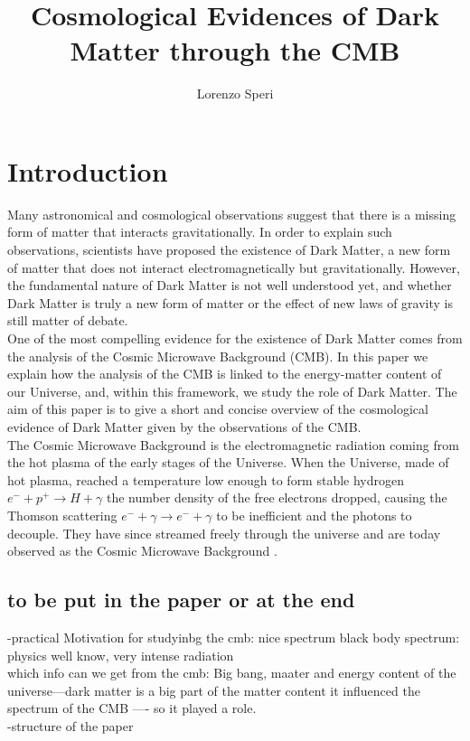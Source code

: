 \documentclass{article}
\title{Cosmological Evidences of Dark Matter through the CMB}
\author{Lorenzo Speri}
\date{}
\begin{document}
\maketitle


\section{Introduction}
Many astronomical and cosmological observations suggest that there is a missing form of matter that interacts gravitationally. 
In order to explain such observations, scientists have proposed the existence of Dark Matter, a new form of matter that does not interact electromagnetically but gravitationally.
However, the fundamental nature of Dark Matter is not well understood yet, and whether Dark Matter is truly a new form of matter or the effect of new laws of gravity is still matter of debate.\\
One of the most compelling evidence for the existence of Dark Matter comes from the analysis of the Cosmic Microwave Background (CMB).
In this paper we explain how the  analysis of the CMB is linked to the energy-matter content of our Universe, and, within this framework, we study the role of Dark Matter.
The aim of this paper is to give a short and concise overview of the cosmological evidence of Dark Matter given by the observations of the CMB.
\\


The Cosmic Microwave Background is the electromagnetic radiation coming from the hot plasma of the early stages of the Universe.
When the Universe, made of hot plasma, reached a temperature low enough to form stable hydrogen $e^- + p^+  \rightarrow H + \gamma$ the number density of the free electrons dropped, causing the Thomson scattering $e^- + \gamma  \rightarrow e^- + \gamma$ to be inefficient and the photons to decouple. They have since streamed freely through the universe and are today observed as the Cosmic Microwave Background \citep{LecturesPdf}.\\
 
 

\subsection{to be put in the paper or at the end}
-practical Motivation for studyinbg the cmb: nice spectrum black body spectrum: physics well know, very intense radiation\\
which info can we get from the cmb: Big bang, maater and energy content of the universe---dark matter is a big part of the matter content it influenced the spectrum  of the CMB ---- so it played a role.\\
-structure of the paper \\
\end{document}
